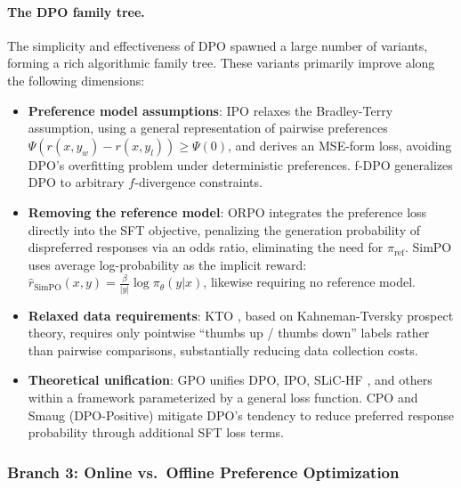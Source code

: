 \paragraph{The DPO family tree.}
The simplicity and effectiveness of DPO spawned a large number of variants, forming a rich algorithmic family tree.
These variants primarily improve along the following dimensions:

\begin{itemize}[leftmargin=2em]
  \item \textbf{Preference model assumptions}:
    IPO \cite{azar2023ipo} relaxes the Bradley-Terry assumption,
    using a general representation of pairwise preferences
    $\Psi(r(x, y_w) - r(x, y_l)) \geq \Psi(0)$,
    and derives an MSE-form loss,
    avoiding DPO's overfitting problem under deterministic preferences.
    f-DPO \cite{wang2023fdpo} generalizes DPO to arbitrary $f$-divergence constraints.

  \item \textbf{Removing the reference model}:
    ORPO \cite{hong2024orpo} integrates the preference loss directly into the SFT objective,
    penalizing the generation probability of dispreferred responses via an odds ratio,
    eliminating the need for $\pi_{\text{ref}}$.
    SimPO \cite{meng2024simpo} uses average log-probability as the implicit reward:
    $\hat{r}_{\text{SimPO}}(x, y) = \frac{\beta}{|y|} \log \pi_\theta(y|x)$,
    likewise requiring no reference model.

  \item \textbf{Relaxed data requirements}:
    KTO \cite{ethayarajh2024kto}, based on Kahneman-Tversky prospect theory,
    requires only pointwise ``thumbs up / thumbs down'' labels
    rather than pairwise comparisons, substantially reducing data collection costs.

  \item \textbf{Theoretical unification}:
    GPO \cite{tang2024gpo} unifies DPO, IPO, SLiC-HF \cite{zhao2023slic}, and others
    within a framework parameterized by a general loss function.
    CPO \cite{xu2024cpo} and Smaug (DPO-Positive) \cite{pal2024smaug}
    mitigate DPO's tendency to reduce preferred response probability through additional SFT loss terms.
\end{itemize}


\subsubsection{Branch 3: Online vs.\ Offline Preference Optimization}
\label{sec:t2-online-offline}

